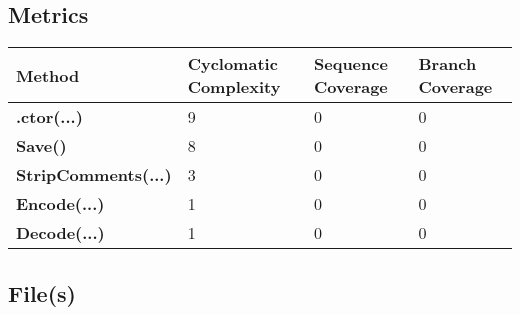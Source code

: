 \documentclass[a4paper,10pt]{article}
\begin{document}
\subsection{Metrics}
\begin{longtable}[l]{|l|l|l|l|}
\hline
\textbf{Method} & \textbf{Cyclomatic Complexity} & \textbf{Sequence Coverage} & \textbf{Branch Coverage}\\
\hline
\textbf{.ctor(...)} & 9 & 0 & 0\\
\hline
\textbf{Save()} & 8 & 0 & 0\\
\hline
\textbf{StripComments(...)} & 3 & 0 & 0\\
\hline
\textbf{Encode(...)} & 1 & 0 & 0\\
\hline
\textbf{Decode(...)} & 1 & 0 & 0\\
\hline
\end{longtable}
\subsection{File(s)}
\end{document}
